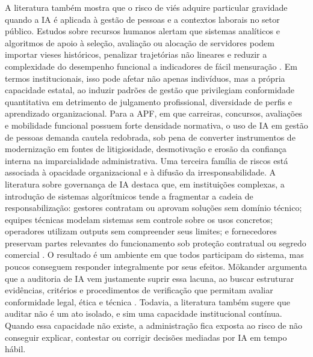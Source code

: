 \documentclass[12pt,a4paper]{article}
\begin{document}
A literatura também mostra que o risco de viés adquire particular gravidade quando a IA é aplicada à gestão de pessoas e a contextos laborais no setor público. Estudos sobre recursos humanos alertam que sistemas analíticos e algoritmos de apoio à seleção, avaliação ou alocação de servidores podem importar vieses históricos, penalizar trajetórias não lineares e reduzir a complexidade do desempenho funcional a indicadores de fácil mensuração \autocite{cho2023human} \autocite{chilunjika2022artificial} \autocite{barros2025inteligencia}. Em termos institucionais, isso pode afetar não apenas indivíduos, mas a própria capacidade estatal, ao induzir padrões de gestão que privilegiam conformidade quantitativa em detrimento de julgamento profissional, diversidade de perfis e aprendizado organizacional. Para a APF, em que carreiras, concursos, avaliações e mobilidade funcional possuem forte densidade normativa, o uso de IA em gestão de pessoas demanda cautela redobrada, sob pena de converter instrumentos de modernização em fontes de litigiosidade, desmotivação e erosão da confiança interna na imparcialidade administrativa.
Uma terceira família de riscos está associada à opacidade organizacional e à difusão da irresponsabilidade. A literatura sobre governança de IA destaca que, em instituições complexas, a introdução de sistemas algorítmicos tende a fragmentar a cadeia de responsabilização: gestores contratam ou aprovam soluções sem domínio técnico; equipes técnicas modelam sistemas sem controle sobre os usos concretos; operadores utilizam outputs sem compreender seus limites; e fornecedores preservam partes relevantes do funcionamento sob proteção contratual ou segredo comercial \autocite{batool2025ai} \autocite{mkander2023auditing} \autocite{brkan2020legal}. O resultado é um ambiente em que todos participam do sistema, mas poucos conseguem responder integralmente por seus efeitos. Mökander argumenta que a auditoria de IA vem justamente suprir essa lacuna, ao buscar estruturar evidências, critérios e procedimentos de verificação que permitam avaliar conformidade legal, ética e técnica \autocite{mkander2023auditing}. Todavia, a literatura também sugere que auditar não é um ato isolado, e sim uma capacidade institucional contínua. Quando essa capacidade não existe, a administração fica exposta ao risco de não conseguir explicar, contestar ou corrigir decisões mediadas por IA em tempo hábil.
\end{document}

